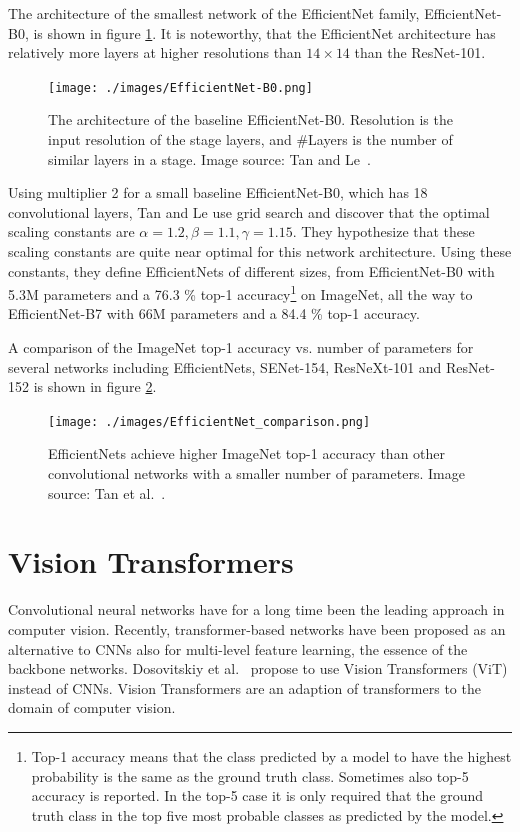 \documentclass[english,twoside,openright]{HYgraduMLDS}
\begin{document}
The architecture of the smallest network of the EfficientNet family, EfficientNet-B0, is shown in figure \ref{fig:EfficientNet-B0}. It is noteworthy, that the EfficientNet architecture has relatively more layers at higher resolutions than $14 \times 14$ than the ResNet-101.

\begin{figure}[h] 
\centering
\texttt{[image: ./images/EfficientNet-B0.png]}
\caption{The architecture of the baseline EfficientNet-B0. Resolution is the input resolution of the stage layers, and \#Layers is the number of similar layers in a stage. Image source: Tan and Le~\cite{EfficientNet}.}
\label{fig:EfficientNet-B0} 
\end{figure}

Using multiplier 2 for a small baseline EfficientNet-B0, which has 18 convolutional layers, Tan and Le use grid search and discover that the optimal scaling constants are $\alpha = 1.2, \beta = 1.1, \gamma = 1.15$. They hypothesize that these scaling constants are quite near optimal for this network architecture. Using these constants, they define EfficientNets of different sizes, from EfficientNet-B0 with 5.3M parameters and a 76.3 \% top-1 accuracy\footnote{Top-1 accuracy means that the class predicted by a model to have the highest probability is the same as the ground truth class. Sometimes also top-5 accuracy is reported. In the top-5 case it is only required that the ground truth class in the top five most probable classes as predicted by the model.} on ImageNet, all the way to EfficientNet-B7 with 66M parameters and a 84.4 \% top-1 accuracy.

A comparison of the ImageNet top-1 accuracy vs. number of parameters for several networks including EfficientNets, SENet-154, ResNeXt-101 and ResNet-152 is shown in figure \ref{fig:EfficientNet_comparison}.

\begin{figure}[h] 
\centering
\texttt{[image: ./images/EfficientNet\_comparison.png]}
\caption{EfficientNets achieve higher ImageNet top-1 accuracy than other convolutional networks with a smaller number of parameters. Image source: Tan et al.~\cite{EfficientNet}.}
\label{fig:EfficientNet_comparison} 
\end{figure}

\section{Vision Transformers}
\label{section:VisionTransformers}
Convolutional neural networks have for a long time been the leading approach in computer vision. Recently, transformer-based networks have been proposed as an alternative to CNNs also for multi-level feature learning, the essence of the backbone networks.
Dosovitskiy et al.~\cite{VisionTransformers} propose to use Vision Transformers (ViT) instead of CNNs. Vision Transformers are an adaption of transformers to the domain of computer vision. 
\end{document}
